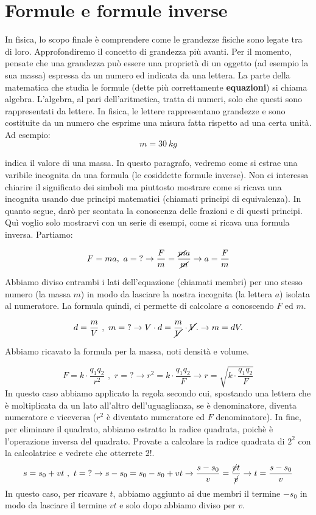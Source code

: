 \section{Formule e formule inverse}

In fisica, lo scopo finale è comprendere come le grandezze fisiche  sono legate tra di loro. Approfondiremo il concetto di grandezza più avanti. Per il momento, pensate che una grandezza può essere una proprietà di un oggetto (ad esempio la sua massa) espressa da un numero ed indicata da una lettera. La parte della matematica che studia le formule (dette più correttamente \textbf{equazioni}) si chiama algebra. L'algebra, al pari dell'aritmetica, tratta di numeri, solo che questi sono rappresentati da lettere. In fisica, le lettere rappresentano grandezze e sono costituite da un numero che esprime una misura fatta rispetto ad una certa unità. Ad esempio:
\[
m=\SI{30}{kg}
\]

indica il valore di una massa. In questo paragrafo, vedremo come si estrae una varibile incognita da una formula (le cosiddette formule inverse). Non ci interessa chiarire il significato dei simboli ma piuttosto mostrare come si ricava una incognita usando due principi matematici (chiamati principi di equivalenza). In quanto segue, darò per scontata la conoscenza delle frazioni e di questi principi. Quì voglio solo mostrarvi con un serie di esempi, come si ricava una formula inversa. Partiamo:

	
	
	\[F= ma, \,\,  a = \text{?} \rightarrow \frac{F}{m} =\frac{\cancel{m} a}{\cancel{m}}\rightarrow a=\frac{F}{m}
	\]

 Abbiamo diviso entrambi i lati dell'equazione (chiamati membri) per uno stesso numero (la massa $m$) in modo da lasciare la nostra incognita (la lettera $a$) isolata al numeratore. La formula quindi, ci permette di calcolare $a$ conoscendo $F$ ed $m$.

\[
d=\frac{m}{V} \,\,\text{,}\,\,\,  m=\text{?} \rightarrow  V\cdot  d = \frac{m}{\cancel{V}}\cdot \cancel{V}.\rightarrow m = d V.
\]

Abbiamo ricavato la formula per la massa, noti densità e volume.

\[
F=k\cdot \frac{q_1 q_2}{r^2} \,\,\text{,}\,\,\,  r=\text{?} \rightarrow r^2 = k\cdot \frac{q_1 q_2}{F}\rightarrow r=\sqrt{k\cdot \frac{q_1 q_2}{F}}
\]
In questo caso abbiamo applicato la regola secondo cui, spostando una lettera che è moltiplicata da un lato all'altro dell'uguaglianza, se è denominatore, diventa numeratore e viceversa ($r^2$ è diventato numeratore ed $F$ denominatore). In fine, per eliminare il quadrato, abbiamo estratto la radice quadrata, poichè è l'operazione inversa del quadrato. Provate a calcolare la radice quadrata di $2^2$ con la calcolatrice e vedrete che otterrete 2!.
\[
s= s_0 + v t \,\,\text{,}\,\,\,  t=\text{?} \rightarrow s-s_0 = s_0 -s_0 + v t\rightarrow \frac{s-s_0}{v} = \frac{\cancel{v} t }{\cancel{v}}\rightarrow t=\frac{s-s_0}{v}
\]
In questo caso, per ricavare $t$, abbiamo aggiunto ai due membri il termine $-s_0$ in modo da lasciare il termine $v t$ e solo dopo abbiamo diviso per $v$.


